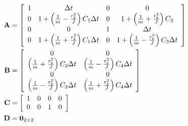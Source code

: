 \begin{align}
  \mathbf{A} &= \left[
  \begin{array}{cccc}
    1 & \Delta t & 0 & 0 \\
    0 & 1 + \left(\frac{1}{m} - \frac{r_b^2}{J}\right) C_1 \Delta t & 0 &
      1 + \left(\frac{1}{m} + \frac{r_b^2}{J}\right) C_3 \\
    0 & 0 & 1 & \Delta t \\
    0 & 1 + \left(\frac{1}{m} + \frac{r_b^2}{J}\right) C_1 \Delta t & 0 &
      1 + \left(\frac{1}{m} - \frac{r_b^2}{J}\right) C_3 \Delta t
  \end{array}
  \right] \\
  \mathbf{B} &= \left[
  \begin{array}{cc}
    0 & 0 \\
    \left(\frac{1}{m} + \frac{r_b^2}{J}\right) C_2 \Delta t &
      \left(\frac{1}{m} - \frac{r_b^2}{J}\right) C_4 \Delta t \\
    0 & 0 \\
    \left(\frac{1}{m} - \frac{r_b^2}{J}\right) C_2 \Delta t &
      \left(\frac{1}{m} + \frac{r_b^2}{J}\right) C_4 \Delta t
  \end{array}
  \right] \\
  \mathbf{C} &= \left[
  \begin{array}{cccc}
    1 & 0 & 0 & 0 \\
    0 & 0 & 1 & 0 \\
  \end{array}
  \right] \\
  \mathbf{D} &= \mathbf{0}_{2 \times 2}
\end{align}
